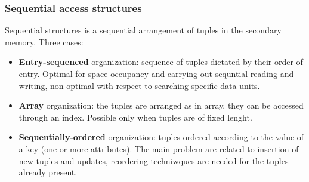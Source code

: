 \subsubsection{Sequential access structures}
Sequential structures is a sequential arrangement of tuples in the secondary memory.\newline
\newline
Three cases:
\begin{itemize}
    \item \textbf{Entry-sequenced} organization: sequence of tuples dictated by their order of entry. Optimal for space occupancy and carrying out sequntial reading and writing, non optimal with respect to searching specific data units.
    \item \textbf{Array} organization: the tuples are arranged as in array, they can be accessed through an index. Possible only when tuples are of fixed lenght.
    \item \textbf{Sequentially-ordered} organization: tuples ordered according to the value of a key (one or more attributes). The main problem are related to insertion of new tuples and updates, reordering techniwques are needed for the tuples already present.
\end{itemize}
